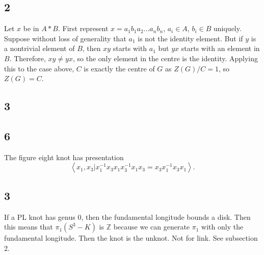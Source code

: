 \documentclass{article}
\theoremstyle{definition}
\numberwithin{theorem}{section}
\numberwithin{equation}{section}
\begin{document}
\subsection{2}
Let $x$ be in $A * B$. First represent $x = a_1 b_1 a_2 \ldots a_n b_n$, $a_i \in A$, $b_i \in B$ uniquely. Suppose without loss of generality that $a_1$ is not the identity element. But if $y$ is a nontrivial element of $B$, then $xy$ starts with $a_1$ but $yx$ starts with an element in $B$. Therefore, $xy \neq yx$, so the only element in the centre is the identity. Applying this to the case above, $C$ is exactly the centre of $G$ as $Z(G)/C = 1$, so $Z(G) = C$. 

\subsection{3}


\subsection{6}
The figure eight knot has presentation 
\begin{equation*}
    \left\langle
        x_1, x_3 | x_1^{-1} x_3 x_1 x_3^{-1} x_1 x_3 = x_3 x_1^{-1} x_3 x_1
    \right\rangle.
\end{equation*}




\subsection{3}
If a PL knot has genus 0, then the fundamental longitude bounds a disk. Then this means that $\pi_1(S^3 - K)$ is $\mathbb{Z}$ because we can generate $\pi_1$ with only the fundamental longitude. Then the knot is the unknot. Not for link. See subsection 2.
\end{document}
